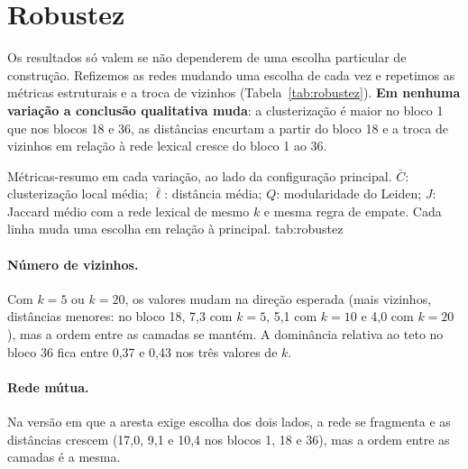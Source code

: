\section{Robustez}\label{sec:robustez}

Os resultados só valem se não dependerem de uma escolha particular de construção. Refizemos as
redes mudando uma escolha de cada vez e repetimos as métricas estruturais e a troca de vizinhos
(Tabela~\ref{tab:robustez}). \textbf{Em nenhuma variação a conclusão qualitativa muda}: a
clusterização é maior no bloco 1 que nos blocos 18 e 36, as distâncias encurtam a partir do
bloco 18 e a troca de vizinhos em relação à rede lexical cresce do bloco 1 ao 36.

    {Métricas-resumo em cada variação, ao lado da configuração principal. $\bar C$:
    clusterização local média; $\bar\ell$: distância média; $Q$: modularidade do Leiden;
    $J$: Jaccard médio com a rede lexical de mesmo $k$ e mesma regra de empate. Cada linha
    muda uma escolha em relação à principal.}
    {tab:robustez}

\paragraph{Número de vizinhos.} Com $k=5$ ou $k=20$, os valores mudam na direção esperada
(mais vizinhos, distâncias menores: no bloco 18, 7,3 com $k=5$, 5,1 com $k=10$ e 4,0 com
$k=20$), mas a ordem entre as camadas se mantém. A dominância relativa ao teto no bloco 36
fica entre 0,37 e 0,43 nos três valores de $k$.

\paragraph{Rede mútua.} Na versão em que a aresta exige escolha dos dois lados, a rede se
fragmenta e as distâncias crescem (17,0, 9,1 e 10,4 nos blocos 1, 18 e 36), mas a ordem entre as
camadas é a mesma.

